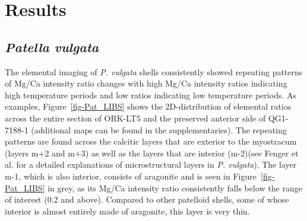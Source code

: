 \documentclass[
  authoryear,
  preprint,
  3p]{elsarticle}
\begin{document}
\section{Results}\label{Results}

\subsection{\texorpdfstring{\emph{Patella
vulgata}}{Patella vulgata}}\label{patella-vulgata}

The elemental imaging of \emph{P. vulgata} shells consistently showed
repeating patterns of Mg/Ca intensity ratio changes with high Mg/Ca
intensity ratios indicating high temperature periods and low ratios
indicating low temperature periods. As examples,
Figure~\ref{fig-Pat_LIBS} shows the 2D-distribution of elemental ratios
across the entire section of ORK-LT5 and the preserved anterior side of
QG1-7188-1 (additional maps can be found in the supplementaries). The
repeating patterns are found across the calcitic layers that are
exterior to the myostracum (layers m+2 and m+3) as well as the layers
that are interior (m-2)(see Fenger et al. \citeyearpar{Fenger2007-gf}
for a detailed explanations of microstructural layers in \emph{P.
vulgata}). The layer m-1, which is also interior, consists of aragonite
and is seen in Figure~\ref{fig-Pat_LIBS} in grey, as its Mg/Ca intensity
ratio consistently falls below the range of interest (0.2 and above).
Compared to other patelloid shells, some of whose interior is almost
entirely made of aragonite, this layer is very thin. \newline
\end{document}
